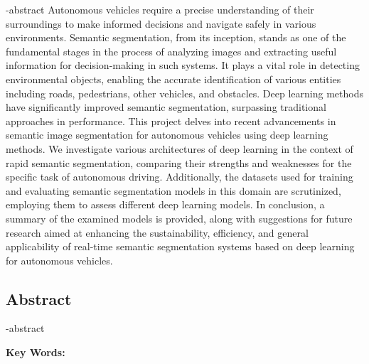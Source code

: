 
\en-abstract{
Autonomous vehicles require a precise understanding of their surroundings to make informed decisions and navigate safely in various environments. Semantic segmentation, from its inception, stands as one of the fundamental stages in the process of analyzing images and extracting useful information for decision-making in such systems. It plays a vital role in detecting environmental objects, enabling the accurate identification of various entities including roads, pedestrians, other vehicles, and obstacles. Deep learning methods have significantly improved semantic segmentation, surpassing traditional approaches in performance. This project delves into recent advancements in semantic image segmentation for autonomous vehicles using deep learning methods. We investigate various architectures of deep learning in the context of rapid semantic segmentation, comparing their strengths and weaknesses for the specific task of autonomous driving. Additionally, the datasets used for training and evaluating semantic segmentation models in this domain are scrutinized, employing them to assess different deep learning models. In conclusion, a summary of the examined models is provided, along with suggestions for future research aimed at enhancing the sustainability, efficiency, and general applicability of real-time semantic segmentation systems based on deep learning for autonomous vehicles.
}

\newpage
\thispagestyle{empty}
\begin{latin}
\section*{\LARGE\centering Abstract}

\een-abstract

\vspace*{.5cm}
{\large\textbf{Key Words:}}\par
\vspace*{.5cm}
\elatinkeywords
\end{latin}